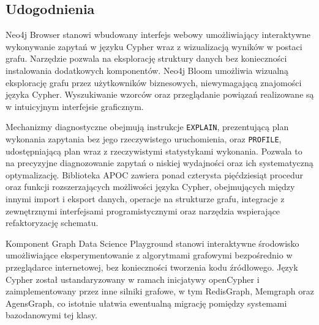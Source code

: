 \subsection{Udogodnienia}

Neo4j Browser stanowi wbudowany interfejs webowy umożliwiający interaktywne
wykonywanie zapytań w języku Cypher wraz z wizualizacją wyników w postaci
grafu. Narzędzie pozwala na eksplorację struktury danych bez konieczności
instalowania dodatkowych komponentów. Neo4j Bloom umożliwia wizualną
eksplorację grafu przez użytkowników biznesowych, niewymagającą znajomości
języka Cypher. Wyszukiwanie wzorców oraz przeglądanie powiązań realizowane
są w intuicyjnym interfejsie graficznym.

Mechanizmy diagnostyczne obejmują instrukcje \texttt{EXPLAIN}, prezentującą
plan wykonania zapytania bez jego rzeczywistego uruchomienia, oraz
\texttt{PROFILE}, udostępniającą plan wraz z rzeczywistymi statystykami
wykonania. Pozwala to na precyzyjne diagnozowanie zapytań o niskiej wydajności
oraz ich systematyczną optymalizację. Biblioteka APOC zawiera ponad
czterysta pięćdziesiąt procedur oraz funkcji rozszerzających możliwości
języka Cypher, obejmujących między innymi import i eksport danych, operacje
na strukturze grafu, integracje z zewnętrznymi interfejsami programistycznymi
oraz narzędzia wspierające refaktoryzację schematu.

Komponent Graph Data Science Playground stanowi interaktywne środowisko
umożliwiające eksperymentowanie z algorytmami grafowymi bezpośrednio
w przeglądarce internetowej, bez konieczności tworzenia kodu źródłowego.
Język Cypher został ustandaryzowany w ramach inicjatywy openCypher
i zaimplementowany przez inne silniki grafowe, w tym RedisGraph, Memgraph
oraz AgensGraph, co istotnie ułatwia ewentualną migrację pomiędzy systemami
bazodanowymi tej klasy.
